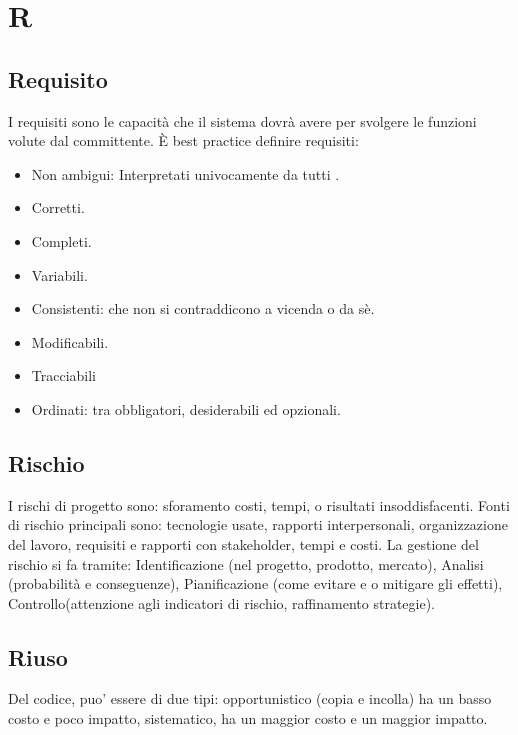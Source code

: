 	\section{R}

	\subsection{Requisito}
	\label{sec:requisito}
	I requisiti sono le capacità che il sistema dovrà avere per svolgere le funzioni volute dal committente. È best practice definire requisiti:
	\begin{itemize}  
	\item Non ambigui: Interpretati univocamente da tutti .
	\item Corretti.
	\item Completi.
	\item Variabili.
	\item Consistenti: che non si contraddicono a vicenda o da sè.
	\item Modificabili.
	\item Tracciabili
	\item Ordinati: tra obbligatori, desiderabili ed opzionali. 
	\end{itemize}

	\subsection{Rischio}
	\label{sec:rischio}
	I rischi di progetto sono: sforamento costi, tempi, o risultati insoddisfacenti. Fonti di rischio principali sono:
	tecnologie usate, rapporti interpersonali, organizzazione del lavoro, requisiti e rapporti con stakeholder, tempi e costi.
	La gestione del rischio si fa tramite:
	Identificazione (nel progetto, prodotto, mercato), Analisi (probabilità e conseguenze), Pianificazione (come evitare e o mitigare gli effetti), Controllo(attenzione agli indicatori di rischio, raffinamento strategie).
	
	\subsection{Riuso}
	\label{sec:riuso}
	Del codice, puo' essere di due tipi: opportunistico (copia e incolla) ha un basso costo e poco impatto, sistematico, ha un maggior costo e un maggior impatto.		

